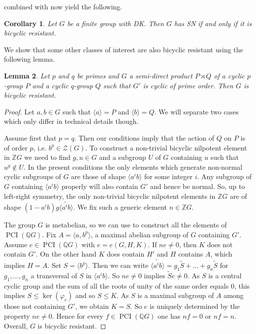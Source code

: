 \documentclass[a4paper,10pt]{amsart}
\newtheorem{lemma}{Lemma}[section]
\newtheorem{corollary}[lemma]{Corollary}
\theoremstyle{definition}
\theoremstyle{remark}
\newcommand\PCI{\operatorname{PCI}}
\newcommand{\ZZ}{\mathcal{Z}}
\newcommand{\Q}{{\mathbb Q}}
\begin{document}
 combined with  now yield the following.

\begin{corollary}\label{prop SN for a DK group}
Let $G$ be a finite group with DK. Then $G$ has SN if and only if it is bicyclic resistant.
\end{corollary}


We show that some other classes of interest are also bicyclic resistant using the following lemma.

\begin{lemma}
Let $p$ and $q$ be primes and $G$ a semi-direct product $P \rtimes Q$ of a cyclic $p$-group $P$ and a cyclic $q$-group $Q$ such that $G'$ is cyclic of prime order. Then $G$ is bicyclic resistant.
\end{lemma} 
\begin{proof}


Let $a,b\in G$ such that $\langle a \rangle = P$ and $\langle b \rangle = Q$. We will separate two cases which only differ in technical details though.

Assume first that $ p = q$. Then our conditions imply that the action of $Q$ on $P$ is of order $p$, i.e. $b^p \in \ZZ(G)$.
To construct a non-trivial bicyclic nilpotent element in $\mathbb{Z}G$ we need to find $g,u \in G$ and a subgroup $U$ of $G$ containing $u$ such that $u^g \notin U$. In the present conditions the only elements which generate non-normal cyclic subgroups of $G$ are those of shape $\langle a^ib \rangle$ for some integer $i$. Any subgroup of $G$ containing $\langle a^ib \rangle$ properly will also contain $G'$ and hence be normal. So, up to left-right symmetry, the only non-trivial bicyclic nilpotent elements in $\mathbb{Z}G$ are of shape $(1-a^ib)g\widetilde{\langle a^ib \rangle}$. We fix such a generic element $n \in \mathbb{Z}G$.

The group $G$ is metabelian, so we can use  to construct all the elements of $\PCI(\Q G)$. Fix $A = \langle a, b^p \rangle$, a maximal abelian subgroup of $G$ containing $G'$. Assume $e \in \PCI(\Q G)$ with $e = e(G,H,K)$. If $ne \neq 0$, then $K$ does not contain $G'$. On the other hand $K$ does contain $H'$ and $H$ contains $A$, which implies $H=A$. Set $S = \langle b^p \rangle$. Then we can write $\widetilde{\langle a^ib \rangle} = g_1\widetilde{S} + ... + g_n\widetilde{S}$ for $g_1,...,g_n$ a transversal of $S$ in $\langle a^ib \rangle$. So $ne \neq 0$ implies $\widetilde{S}e \neq 0$. As $S$ is a central cyclic group and the sum of all the roots of unity of the same order equals $0$, this implies $S \leq \ker(\varphi_e)$ and so $S \leq K$. As $S$ is a maximal subgroup of $A$ among those not containing $G'$, we obtain $K=S$. So $e$ is uniquely determined by the property $ne \neq 0$. Hence for every $f \in \PCI(\Q G)$ one has $nf = 0 $ or $nf=n$. Overall, $G$ is bicyclic resistant.


\end{proof}
\end{document}
